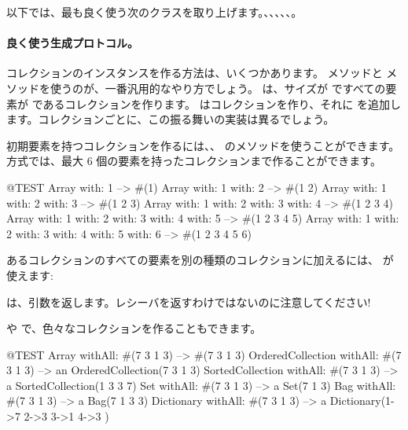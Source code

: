 \documentclass[a4paper,10pt,twoside]{book}
\begin{document}
以下では、最も良く使う次のクラスを取り上げます。、、、、、。

\paragraph{良く使う生成プロトコル。}
コレクションのインスタンスを作る方法は、いくつかあります。 メソッドと  メソッドを使うのが、一番汎用的なやり方でしょう。 は、サイズが  ですべての要素が  であるコレクションを作ります。  はコレクションを作り、それに  を追加します。コレクションごとに、この振る舞いの実装は異るでしょう。%

初期要素を持つコレクションを作るには、、 \etc のメソッドを使うことができます。 方式では、最大 6 個の要素を持ったコレクションまで作ることができます。

\begin{code}{@TEST}
Array with: 1 --> #(1)
Array with: 1 with: 2 --> #(1 2)
Array with: 1 with: 2 with: 3 --> #(1 2 3)
Array with: 1 with: 2 with: 3 with: 4 --> #(1 2 3 4)
Array with: 1 with: 2 with: 3 with: 4 with: 5 --> #(1 2 3 4 5)
Array with: 1 with: 2 with: 3 with: 4 with: 5 with: 6 --> #(1 2 3 4 5 6)
\end{code}

あるコレクションのすべての要素を別の種類のコレクションに加えるには、 が使えます:

\noindent
{} は、引数を返します。レシーバを返すわけではないのに注意してください!

 や  で、色々なコレクションを作ることもできます。

\begin{code}{@TEST}
Array withAll: #(7 3 1 3)                      --> #(7 3 1 3)
OrderedCollection withAll: #(7 3 1 3) --> an OrderedCollection(7 3 1 3)
SortedCollection withAll: #(7 3 1 3)    --> a SortedCollection(1 3 3 7)
Set withAll: #(7 3 1 3)                         --> a Set(7 1 3)
Bag withAll: #(7 3 1 3)                        --> a Bag(7 1 3 3)
Dictionary withAll: #(7 3 1 3)               --> a Dictionary(1->7 2->3 3->1 4->3 )
\end{code}
\end{document}
